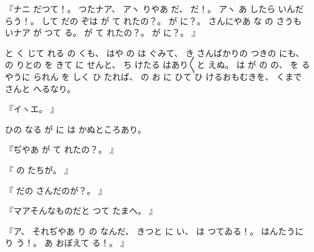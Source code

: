 %
『ナニ
だつて！。
%
つたナア、
%
アヽ
りやあ
だ、
%
だ！。
%
アヽ
あ
したら
いんだらう！。
%
して
だの
ぞは
が
て
れたの？。
%
が
に？。
%
さんにやあ
な
の
さうも
いナア
が
つて
る。
%
が
て
れたの？。
%
が
に？。
』

%
と
く
じて
れる
の
くも、
%
はや
の
は
ぐみて、
%
き
さんばかりの
つきの
にも、
%
の
りとの
を
きて
に
せんと、
%
ち
けたる
はあり〳〵と
えぬ。
%
は
が
の
の、
%
を
るやうに
られん
を
しく
ひ
たれば、
%
の
お
に
ひて
ひ
けるおもむきを、
%
くまで
さんと
へるなり。

%
『イヽエ。
』

%
ひの
なる
が
に
は
かぬところあり。

%
『ぢやあ
が
て
れたの？。
』

%
『
の
たちが。
』

%
『
だの
さんだのが？。
』

%
『マアそんなものだと
つて
たまへ。
』

%
『ア、
%
それぢやあ
り
の
なんだ、
%
きつと
に
い、
%
は
つてゐる！。
%
はんたうに
り
う！。
%
あ
おぼえて
る！。
』

